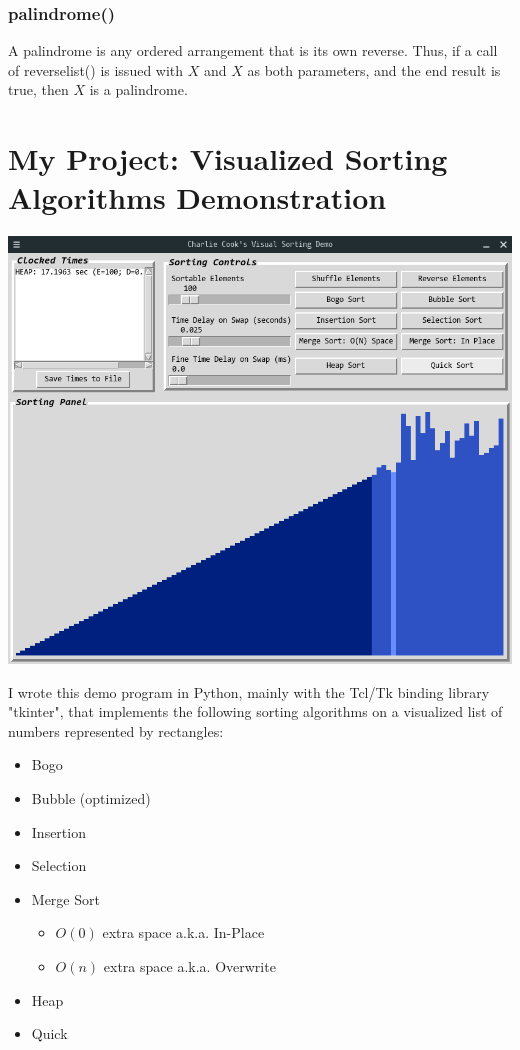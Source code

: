 \documentclass[12pt]{article}
\begin{document}
	\subsubsection{palindrome()}
	A palindrome is any ordered arrangement that is its own reverse. Thus, if a call of reverselist() is issued with $X$ and $X$ as both parameters, and the end result is true, then $X$ is a palindrome.
	\pagebreak

	\section{My Project: Visualized Sorting Algorithms Demonstration}
	\Centering
	\includegraphics[width = 0.8\linewidth]{sortingdemo.png}
	\FlushLeft

	I wrote this demo program in Python, mainly with the Tcl/Tk binding library "tkinter", that implements the following sorting algorithms on a visualized list of numbers represented by rectangles:
	\begin{itemize}
		\item Bogo
		\item Bubble (optimized)
		\item Insertion
		\item Selection
		\item Merge Sort
		\begin{itemize}
			\item $O(0)$ extra space a.k.a. In-Place
			\item $O(n)$ extra space a.k.a. Overwrite
		\end{itemize}
		\item Heap
		\item Quick
	\end{itemize}
\end{document}
